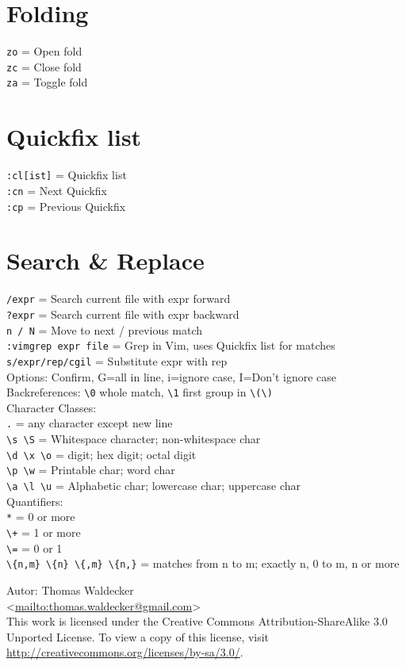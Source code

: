 \documentclass[10pt,DIV=50,landscape,pagesize,parskip=off]{scrartcl}
\newcommand\co[1]{\texttt{#1}}
\newcommand\coe[2]{\co{#1} = #2}
\begin{document}
\begin{multicols}{3}
\section{Folding}
\coe{zo}{Open fold}\\
\coe{zc}{Close fold}\\
\coe{za}{Toggle fold}

\section{Quickfix list}
\coe{:cl[ist]}{Quickfix list}\\
\coe{:cn}{Next Quickfix}\\
\coe{:cp}{Previous Quickfix}

\section{Search \& Replace}
\coe{/expr}{Search current file with expr forward}\\
\coe{?expr}{Search current file with expr backward}\\
\coe{n / N}{Move to next / previous match}\\
\coe{:vimgrep expr file}{Grep in Vim, uses Quickfix list for matches}\\
\coe{s/expr/rep/cgil}{Substitute expr with rep\\Options: Confirm, G=all in line, i=ignore case, I=Don't ignore case}\\
Backreferences: \lstinline|\0| whole match, \lstinline|\1| first group in \lstinline|\(\)|\\
Character Classes:\\
\coe{.}{any character except new line}\\
\lstinline|\s \S| = Whitespace character; non-whitespace char\\
\lstinline|\d \x \o| = digit; hex digit; octal digit\\
\lstinline|\p \w| = Printable char; word char\\
\lstinline|\a \l \u| = Alphabetic char; lowercase char; uppercase char\\
Quantifiers:\\
\lstinline|*| = 0 or more\\
\lstinline|\+| = 1 or more\\
\lstinline|\=| = 0 or 1\\
\lstinline|\{n,m} \{n} \{,m} \{n,}| = matches from n to m; exactly n, 0 to m, n or more

\begin{framed}
{\small Autor: Thomas Waldecker\\
<\url{mailto:thomas.waldecker@gmail.com}>\\ This work is licensed under the
Creative Commons Attribution-ShareAlike 3.0 Unported License. To view a copy of
this license, visit \url{http://creativecommons.org/licenses/by-sa/3.0/}.}
\end{framed}

\end{multicols}
\end{document}
